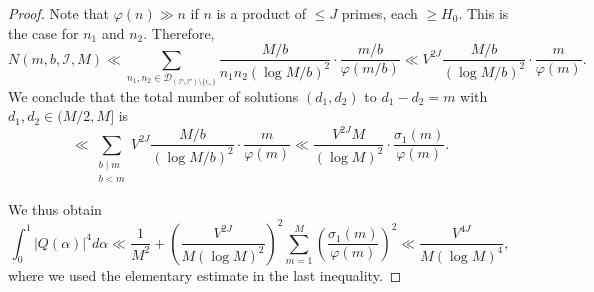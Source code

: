 \documentclass[11pt]{amsart}
\theoremstyle{definition}
\renewcommand{\leq}{\leqslant}
\renewcommand{\geq}{\geqslant}
\newcommand{\D}{\mathcal{D}}
\newcommand{\curlyLexp}[1]{V^{#1}}
\newcommand{\indexset}{\mathcal{I}}
\newcommand{\otherindexset}{\mathcal{I'}}
\newcommand{\repR}{J}
\newcommand{\otherK}{M}
\begin{document}
\begin{proof}
Note that $\varphi(n) \gg n$ if $n$ is a product of $\leq \repR$ primes, each $\geq H_0$. This is the case for $n_1$ and $n_2$. Therefore,
\begin{equation*}
N(m, b, \indexset, \otherK) \ll  \sum_{n_1, n_2\in \D_{(\indexset\setminus \otherindexset)\setminus \{i_+\}}}\frac{\otherK/b}{n_1n_2(\log \otherK/b)^2} \cdot \frac{m/b}{\varphi(m/b)} \ll \curlyLexp{2\repR}\frac{\otherK/b}{(\log \otherK/b)^2} \cdot \frac{m}{\varphi(m)}.
\end{equation*}
We conclude that the total number of solutions $(d_1, d_2)$ to $d_1-d_2 = m$ with $d_1, d_2\in (\otherK/2, \otherK]$ is
\begin{equation*}
\ll \sum_{\substack{b\mid m\\ b< m}}\curlyLexp{2\repR}\frac{\otherK/b}{(\log \otherK/b)^2} \cdot \frac{m}{\varphi(m)} \ll \frac{\curlyLexp{2\repR} \otherK}{(\log \otherK)^2}\cdot \frac{\sigma_1(m)}{\varphi(m)}.
\end{equation*}

We thus obtain
\begin{equation*}
\int_{0}^1 |Q(\alpha)|^4 d\alpha \ll \frac{1}{\otherK^2} + \left(\frac{\curlyLexp{2\repR}}{\otherK(\log \otherK)^2}\right)^2 \sum_{m=1}^{\otherK} \left(\frac{\sigma_1(m)}{\varphi(m)}\right)^2 \ll \frac{\curlyLexp{4\repR}}{\otherK (\log \otherK)^4},
\end{equation*}
where we used the elementary estimate \cite[Corollary~3.6]{tenenbaum} in the last inequality. 
\end{proof}
\end{document}
